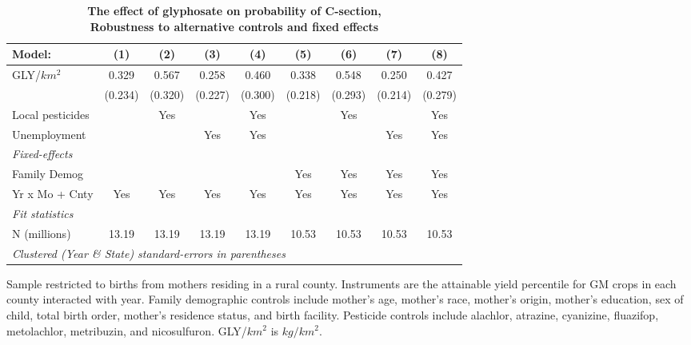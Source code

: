 \begin{table}[htbp]
   \centering
   \small
   \begin{threeparttable}[b]
      \caption{\label{tab:robust-cntrl-c_section-allyielddiffpercentilegmo} \textbf{The effect of glyphosate on probability of C-section, \\ Robustness to alternative controls and fixed effects}}
      \begin{tabular}{lcccccccc}
         \toprule
         Model:           & (1)     & (2)     & (3)     & (4)     & (5)     & (6)     & (7)     & (8)\\  
         \midrule 
         GLY/$km^2$       & 0.329   & 0.567   & 0.258   & 0.460   & 0.338   & 0.548   & 0.250   & 0.427\\   
                          & (0.234) & (0.320) & (0.227) & (0.300) & (0.218) & (0.293) & (0.214) & (0.279)\\   
         Local pesticides &         & Yes     &         & Yes     &         & Yes     &         & Yes\\  
         Unemployment     &         &         & Yes     & Yes     &         &         & Yes     & Yes\\  
         \midrule
         \emph{Fixed-effects}\\
         Family Demog     &         &         &         &         & Yes     & Yes     & Yes     & Yes\\  
         Yr x Mo + Cnty   & Yes     & Yes     & Yes     & Yes     & Yes     & Yes     & Yes     & Yes\\  
         \midrule
         \emph{Fit statistics}\\
         N (millions)     & 13.19   & 13.19   & 13.19   & 13.19   & 10.53   & 10.53   & 10.53   & 10.53\\  
         \midrule
         \multicolumn{9}{l}{\emph{Clustered (Year \& State) standard-errors in parentheses}}\\
      \end{tabular}
      
      \begin{tablenotes}\item Sample restricted to births from mothers residing in a rural county. Instruments are the attainable yield percentile for GM crops in each county interacted with year. Family demographic controls include mother's age, mother's race, mother's origin, mother's education, sex of child, total birth order, mother's residence status, and birth facility. Pesticide controls include alachlor, atrazine, cyanizine, fluazifop, metolachlor, metribuzin, and nicosulfuron. GLY/$km^2$ is $kg/km^2$.
      \end{tablenotes}
   \end{threeparttable}
\end{table}
